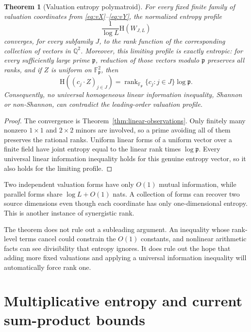\documentclass[11pt,oneside]{article}
\newtheorem{theorem}{Theorem}[section]
\theoremstyle{definition}
\theoremstyle{remark}
\newcommand{\Q}{\mathbb{Q}}
\newcommand{\F}{\mathbb{F}}
\newcommand{\HH}{\mathrm{H}}
\newcommand{\rank}{\operatorname{rank}}
\begin{document}
\begin{theorem}[Valuation entropy polymatroid]\label{thm:valuation-matroid}
For every fixed finite family of valuation coordinates from \eqref{eq:vX}--\eqref{eq:vY}, the normalized entropy profile
\begin{equation}\label{eq:normalized-profile}
 \frac{1}{\log L}\HH(W_{J,L})
\end{equation}
converges, for every subfamily $J$, to the rank function of the corresponding collection of vectors in $\Q^2$.
Moreover, this limiting profile is exactly entropic: for every sufficiently large prime $\mathfrak p$, reduction of those vectors modulo $\mathfrak p$ preserves all ranks, and if $Z$ is uniform on $\F_{\mathfrak p}^2$, then
\begin{equation}\label{eq:finite-field-profile}
 \HH((c_j\cdot Z)_{j\in J})
 =\rank_{\F_{\mathfrak p}}\{c_j:j\in J\}\log\mathfrak p.
\end{equation}
Consequently, no universal homogeneous linear information inequality, Shannon or non-Shannon, can contradict the leading-order valuation profile.
\end{theorem}

\begin{proof}
The convergence is Theorem~\ref{thm:linear-observations}.  Only finitely many nonzero $1\times1$ and $2\times2$ minors are involved, so a prime avoiding all of them preserves the rational ranks.  Uniform linear forms of a uniform vector over a finite field have joint entropy equal to the linear rank times $\log\mathfrak p$.  Every universal linear information inequality holds for this genuine entropy vector, so it also holds for the limiting profile.
\end{proof}

Two independent valuation forms have only $O(1)$ mutual information, while parallel forms share $\log L+O(1)$ nats.  A collection of forms can recover two source dimensions even though each coordinate has only one-dimensional entropy.  This is another instance of synergistic rank.

The theorem does not rule out a subleading argument.  An inequality whose rank-level terms cancel could constrain the $O(1)$ constants, and nonlinear arithmetic facts can see divisibility that entropy ignores.  It does rule out the hope that adding more fixed valuations and applying a universal information inequality will automatically force rank one.

\section{Multiplicative entropy and current sum-product bounds}\label{sec:product-entropy}
\end{document}

